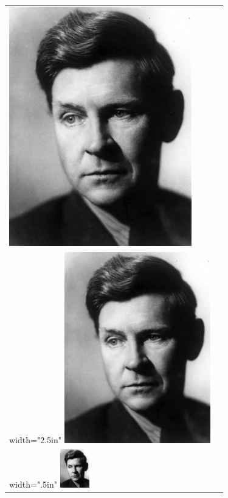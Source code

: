 \documentclass[11pt,twoside]{article}\makeatletter
\begin{document}
\begin{longtable}{P{0.19558457711442787\textwidth}P{0.6544154228855721\textwidth}}
\tabcellsep \noindent\includegraphics[]{portrait.jpg}\\
width="2.5in" \tabcellsep \noindent\includegraphics[width=2.5in,]{portrait.jpg}\\
width=".5in" \tabcellsep \noindent\includegraphics[width=0.5in,]{portrait.jpg}\\

\end{longtable}
\end{document}
